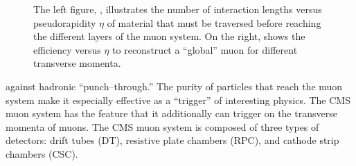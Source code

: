 \begin{figure}
  \centering
   \label{fig:DetectorChapterMuonShit}
  \caption[Muon system material budget and identification efficiency]{The left
  figure, , illustrates the number of
  interaction lengths versus pseudorapidity $\eta$ of material that must be
  traversed before reaching the different layers of the muon system.  On the
  right,  shows the efficiency versus $\eta$
  to reconstruct a ``global'' muon for different transverse momenta.}
\end{figure}
against hadronic ``punch--through.''  The purity of particles that reach the
muon system make it especially effective as a ``trigger'' of interesting
physics. The CMS muon system has the feature that it additionally can trigger on
the transverse momenta of muons. The CMS muon system is composed of three types
of detectors: drift tubes (DT), resistive plate chambers (RPC), and cathode
strip chambers (CSC).  

